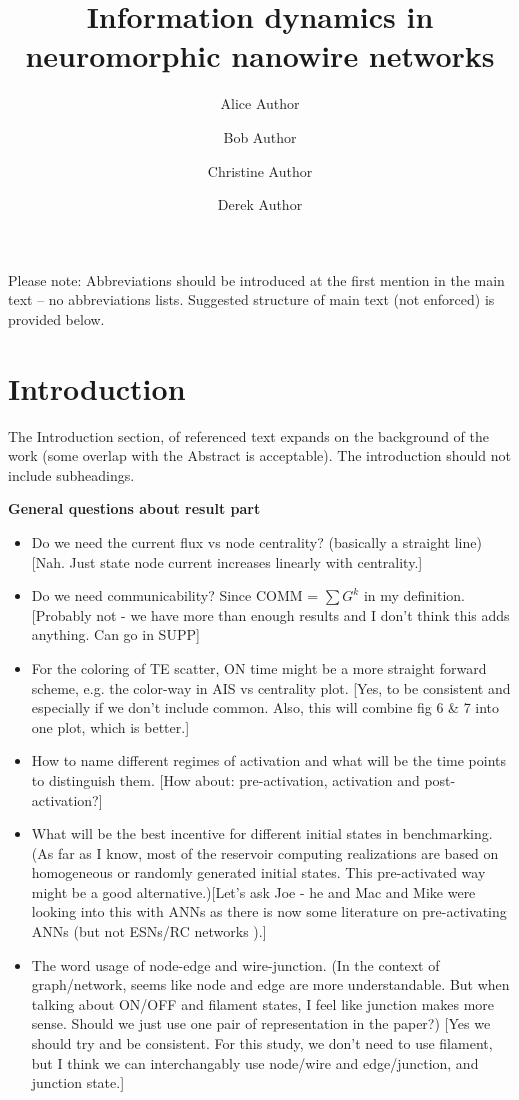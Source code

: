 \documentclass[fleqn,10pt,  reprint, amsmath,amssymb,aps, floatfix]{wlscirep}
\title{Information dynamics in neuromorphic nanowire networks}
\author[1,*]{Alice Author}
\author[2]{Bob Author}
\author[1,2,+]{Christine Author}
\author[2,+]{Derek Author}
\affil[1]{Affiliation, department, city, postcode, country}
\affil[2]{Affiliation, department, city, postcode, country}
\affil[*]{corresponding.author@email.example}
\affil[+]{these authors contributed equally to this work}
\begin{document}
\flushbottom
\maketitle
%
%
\thispagestyle{empty}

\noindent Please note: Abbreviations should be introduced at the first mention in the main text – no abbreviations lists. Suggested structure of main text (not enforced) is provided below.

\section*{Introduction}

The Introduction section, of referenced text expands on the background of the work (some overlap with the Abstract is acceptable). The introduction should not include subheadings.

\clearpage

\textbf{General questions about result part}

\begin{itemize}
	\item Do we need the current flux vs node centrality? (basically a straight line) [Nah. Just state node current increases linearly with centrality.]
	\item Do we need communicability? Since COMM = $\sum G^k$ in my definition.	[Probably not - we have more than enough results and I don't think this adds anything. Can go in SUPP]
	\item  For the coloring of TE scatter, ON time might be a more straight forward scheme, e.g. the color-way in AIS vs centrality plot. [Yes, to be consistent and especially if we don't include common. Also, this will combine fig 6 \& 7 into one plot, which is better.]
	\item How to name different regimes of activation and what will be the time points to distinguish them. [How about: pre-activation, activation and post-activation?]
	\item What will be the best incentive for different initial states in benchmarking. (As far as I know, most of the reservoir computing realizations are based on homogeneous or randomly generated initial states. This pre-activated way might be a good alternative.)[Let's ask Joe - he and Mac and Mike were looking into this with ANNs as there is now some literature on pre-activating ANNs (but not ESNs/RC networks ).]
	\item The word usage of node-edge and wire-junction. (In the context of graph/network, seems like node and edge are more understandable. But when talking about ON/OFF and filament states, I feel like junction makes more sense. Should we just use one pair of representation in the paper?) [Yes we should try and be consistent. For this study, we don't need to use filament, but I think we can interchangably use node/wire and edge/junction, and junction state.]
\end{itemize}
\end{document}
